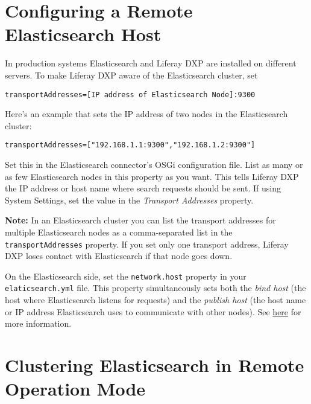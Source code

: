 \section{Configuring a Remote Elasticsearch
Host}\label{configuring-a-remote-elasticsearch-host}

In production systems Elasticsearch and Liferay DXP are installed on
different servers. To make Liferay DXP aware of the Elasticsearch
cluster, set

\begin{verbatim}
transportAddresses=[IP address of Elasticsearch Node]:9300
\end{verbatim}

Here's an example that sets the IP address of two nodes in the
Elasticsearch cluster:

\begin{verbatim}
transportAddresses=["192.168.1.1:9300","192.168.1.2:9300"]
\end{verbatim}

Set this in the Elasticsearch connector's OSGi configuration file. List
as many or as few Elasticsearch nodes in this property as you want. This
tells Liferay DXP the IP address or host name where search requests
should be sent. If using System Settings, set the value in the
\emph{Transport Addresses} property.

\noindent\hrulefill

\textbf{Note:} In an Elasticsearch cluster you can list the transport
addresses for multiple Elasticsearch nodes as a comma-separated list in
the \texttt{transportAddresses} property. If you set only one transport
address, Liferay DXP loses contact with Elasticsearch if that node goes
down.

\noindent\hrulefill

On the Elasticsearch side, set the \texttt{network.host} property in
your \texttt{elaticsearch.yml} file. This property simultaneously sets
both the \emph{bind host} (the host where Elasticsearch listens for
requests) and the \emph{publish host} (the host name or IP address
Elasticsearch uses to communicate with other nodes). See
\href{https://www.elastic.co/guide/en/elasticsearch/reference/7.x/modules-network.html}{here}
for more information.

\section{Clustering Elasticsearch in Remote Operation
Mode}\label{clustering-elasticsearch-in-remote-operation-mode}


